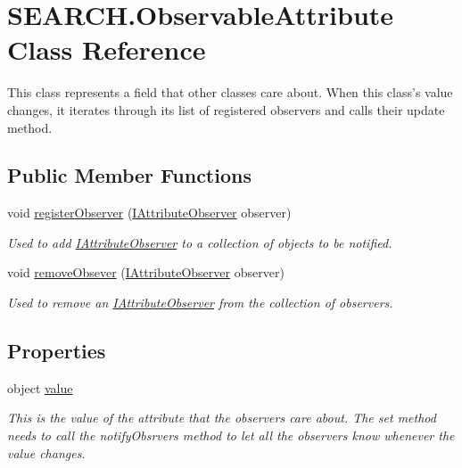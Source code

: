 \hypertarget{class_s_e_a_r_c_h_1_1_observable_attribute}{\section{S\-E\-A\-R\-C\-H.\-Observable\-Attribute Class Reference}
\label{class_s_e_a_r_c_h_1_1_observable_attribute}
}


This class represents a field that other classes care about. When this class's value changes, it iterates through its list of registered observers and calls their update method.  


\subsection*{Public Member Functions}
\begin{DoxyCompactItemize}
\item 
void \hyperlink{class_s_e_a_r_c_h_1_1_observable_attribute_a0a8ac2207abf1b29e727a1106059c738}{register\-Observer} (\hyperlink{interface_s_e_a_r_c_h_1_1_i_attribute_observer}{I\-Attribute\-Observer} observer)
\begin{DoxyCompactList}\small\item\em Used to add \hyperlink{interface_s_e_a_r_c_h_1_1_i_attribute_observer}{I\-Attribute\-Observer} to a collection of objects to be notified. \end{DoxyCompactList}\item 
void \hyperlink{class_s_e_a_r_c_h_1_1_observable_attribute_a70c4e2ca838086984151026263d89177}{remove\-Obsever} (\hyperlink{interface_s_e_a_r_c_h_1_1_i_attribute_observer}{I\-Attribute\-Observer} observer)
\begin{DoxyCompactList}\small\item\em Used to remove an \hyperlink{interface_s_e_a_r_c_h_1_1_i_attribute_observer}{I\-Attribute\-Observer} from the collection of observers. \end{DoxyCompactList}\end{DoxyCompactItemize}
\subsection*{Properties}
\begin{DoxyCompactItemize}
\item 
object \hyperlink{class_s_e_a_r_c_h_1_1_observable_attribute_a3a39d840a48304dfb72a26132e402f06}{value}
\begin{DoxyCompactList}\small\item\em This is the value of the attribute that the observers care about. The set method needs to call the notify\-Obsrvers method to let all the observers know whenever the value changes. \end{DoxyCompactList}\end{DoxyCompactItemize}


